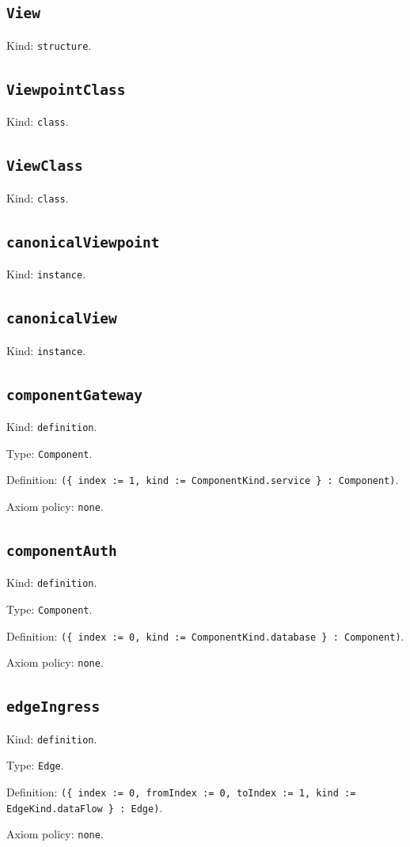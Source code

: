 \documentclass[11pt]{article}
\begin{document}
\subsection*{\texttt{View}}
\noindent Kind: \texttt{structure}.\par
\subsection*{\texttt{ViewpointClass}}
\noindent Kind: \texttt{class}.\par
\subsection*{\texttt{ViewClass}}
\noindent Kind: \texttt{class}.\par
\subsection*{\texttt{canonicalViewpoint}}
\noindent Kind: \texttt{instance}.\par
\subsection*{\texttt{canonicalView}}
\noindent Kind: \texttt{instance}.\par
\subsection*{\texttt{componentGateway}}
\noindent Kind: \texttt{definition}.\par
\noindent Type: \texttt{Component}.\par
\noindent Definition: \texttt{(\{ index := 1, kind := ComponentKind.service \} : Component)}.\par
\noindent Axiom policy: \texttt{none}.\par
\subsection*{\texttt{componentAuth}}
\noindent Kind: \texttt{definition}.\par
\noindent Type: \texttt{Component}.\par
\noindent Definition: \texttt{(\{ index := 0, kind := ComponentKind.database \} : Component)}.\par
\noindent Axiom policy: \texttt{none}.\par
\subsection*{\texttt{edgeIngress}}
\noindent Kind: \texttt{definition}.\par
\noindent Type: \texttt{Edge}.\par
\noindent Definition: \texttt{(\{ index := 0, fromIndex := 0, toIndex := 1, kind := EdgeKind.dataFlow \} : Edge)}.\par
\noindent Axiom policy: \texttt{none}.\par
\end{document}
